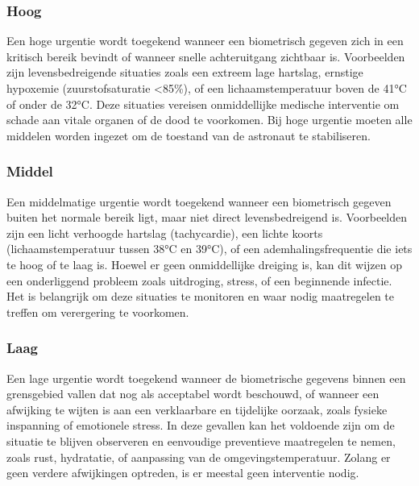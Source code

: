 \subsubsection{Hoog}
Een hoge urgentie wordt toegekend wanneer een biometrisch gegeven zich in een kritisch bereik bevindt of wanneer snelle achteruitgang zichtbaar is. Voorbeelden zijn levensbedreigende situaties zoals een extreem lage hartslag, ernstige hypoxemie (zuurstofsaturatie <85\%), of een lichaamstemperatuur boven de 41°C of onder de 32°C. Deze situaties vereisen onmiddellijke medische interventie om schade aan vitale organen of de dood te voorkomen. Bij hoge urgentie moeten alle middelen worden ingezet om de toestand van de astronaut te stabiliseren.

\subsubsection{Middel}
Een middelmatige urgentie wordt toegekend wanneer een biometrisch gegeven buiten het normale bereik ligt, maar niet direct levensbedreigend is. Voorbeelden zijn een licht verhoogde hartslag (tachycardie), een lichte koorts (lichaamstemperatuur tussen 38°C en 39°C), of een ademhalingsfrequentie die iets te hoog of te laag is. Hoewel er geen onmiddellijke dreiging is, kan dit wijzen op een onderliggend probleem zoals uitdroging, stress, of een beginnende infectie. Het is belangrijk om deze situaties te monitoren en waar nodig maatregelen te treffen om verergering te voorkomen.

\subsubsection{Laag}
Een lage urgentie wordt toegekend wanneer de biometrische gegevens binnen een grensgebied vallen dat nog als acceptabel wordt beschouwd, of wanneer een afwijking te wijten is aan een verklaarbare en tijdelijke oorzaak, zoals fysieke inspanning of emotionele stress. In deze gevallen kan het voldoende zijn om de situatie te blijven observeren en eenvoudige preventieve maatregelen te nemen, zoals rust, hydratatie, of aanpassing van de omgevingstemperatuur. Zolang er geen verdere afwijkingen optreden, is er meestal geen interventie nodig.

